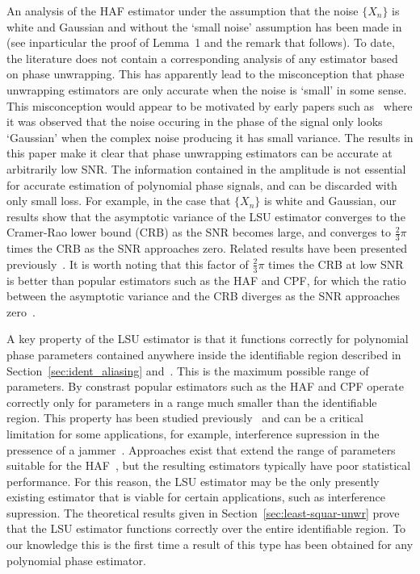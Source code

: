 \documentclass[journal]{IEEEtran}
\begin{document}
An analysis of the HAF estimator under the assumption that the noise $\{X_n\}$ is white and Gaussian and without the `small noise' assumption has been made in~\cite{Porat_asympt_HAF_DPT_1996} (see inparticular the proof of Lemma~1 and the remark that follows).  To date, the literature does not contain a corresponding analysis of any estimator based on phase unwrapping.  This has apparently lead to the misconception that phase unwrapping estimators are only accurate when the noise is `small' in some sense.  This misconception would appear to be motivated by early papers such as~\cite{Tretter1985,Kay1989} where it was observed that the noise occuring in the phase of the signal only looks `Gaussian' when the complex noise producing it has small variance.  The results in this paper make it clear that phase unwrapping estimators can be accurate at arbitrarily low SNR.  The information contained in the amplitude is not essential for accurate estimation of polynomial phase signals, and can be discarded with only small loss.  For example, in the case that $\{X_n\}$ is white and Gaussian, our results show that the asymptotic variance of the LSU estimator converges to the Cramer-Rao lower bound (CRB) as the SNR becomes large, and converges to $\tfrac{2}{3}\pi$ times the CRB as the SNR approaches zero.  Related results have been presented previously~\cite{Quinn2009_dasp_phase_only_information_loss}.  It is worth noting that this factor of $\tfrac{2}{3}\pi$ times the CRB at low SNR is better than popular estimators such as the HAF and CPF, for which the ratio between the asymptotic variance and the CRB diverges as the SNR approaches zero~\cite{Porat_asympt_HAF_DPT_1996,Oshea_cpf_2004,Djurovic_haf_cpf_2012}.

A key property of the LSU estimator is that it functions correctly for polynomial phase parameters contained anywhere inside the identifiable region described in Section~\ref{sec:ident_aliasing} and~\cite{Xia_dynamic_range_pps_2001,McKilliam2009IndentifiabliltyAliasingPolyphase}.  This is the maximum possible range of parameters.  By constrast popular estimators such as the HAF and CPF operate correctly only for parameters in a range much smaller than the identifiable region.  This property has been studied previously~\cite{Djurovic_aliasing_2012,McKilliam2009IndentifiabliltyAliasingPolyphase,Zhou_lag_diverity_PPT_1997,Xia_dynamic_range_pps_2001} and can be a critical limitation for some applications, for example, interference supression in the pressence of a jammer~\cite{Djukanovic:2011:PMN:1950994.1951252,Djurovic_aliasing_2012}.  Approaches exist that extend the range of parameters suitable for the HAF~\cite{Zhou_lag_diverity_PPT_1997,Djurovic_aliasing_2012}, but the resulting estimators typically have poor statistical performance.  For this reason, the LSU estimator may be the only presently existing estimator that is viable for certain applications, such as interference supression.  The theoretical results given in Section~\ref{sec:least-squar-unwr} prove that the LSU estimator functions correctly over the entire identifiable region.  To our knowledge this is the first time a result of this type has been obtained for any polynomial phase estimator.
\end{document}
